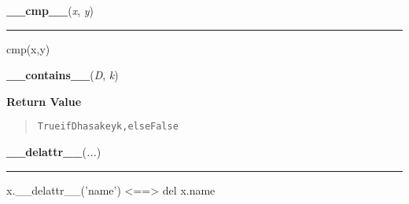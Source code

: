     \vspace{0.5ex}

    \begin{boxedminipage}{\textwidth}

    \raggedright \textbf{\_\_cmp\_\_}(\textit{x}, \textit{y})

    \vspace{-1.5ex}

    \rule{\textwidth}{0.5\fboxrule}
    cmp(x,y)

    \vspace{1ex}

    \end{boxedminipage}

    \label{dict:__contains__}

    \vspace{0.5ex}

    \begin{boxedminipage}{\textwidth}

    \raggedright \textbf{\_\_contains\_\_}(\textit{D}, \textit{k})

      \textbf{Return Value}
      \begin{quote}
\begin{alltt}
True if D has a key k, else False
\end{alltt}

      \end{quote}

    \vspace{1ex}

    \end{boxedminipage}

    \label{object:__delattr__}

    \vspace{0.5ex}

    \begin{boxedminipage}{\textwidth}

    \raggedright \textbf{\_\_delattr\_\_}(\textit{...})

    \vspace{-1.5ex}

    \rule{\textwidth}{0.5\fboxrule}
    x.\_\_delattr\_\_('name') {\textless}=={\textgreater} del x.name

    \vspace{1ex}

    \end{boxedminipage}

